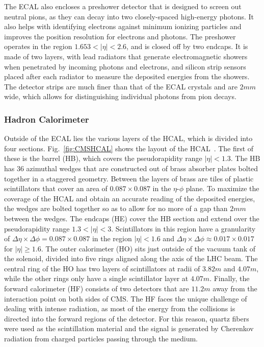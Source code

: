 The ECAL also encloses a preshower detector that is designed to screen out neutral pions, as they can decay into two closely-spaced high-energy photons.
It also helps with identifying electrons against minimum ionizing particles and improves the position resolution for electrons and photons.
The preshower operates in the region $1.653<|\eta|<2.6$, and is closed off by two endcaps.
It is made of two layers, with lead radiators that generate electromagnetic showers when penetrated by incoming photons and electrons, and silicon strip sensors placed after each radiator to measure the deposited energies from the showers.
The detector strips are much finer than that of the ECAL crystals and are $2\unit{mm}$ wide, which allows for distinguishing individual photons from pion decays.

\subsubsection{Hadron Calorimeter}

Outside of the ECAL lies the various layers of the HCAL, which is divided into four sections.
Fig.~\ref{fig:CMSHCAL} shows the layout of the HCAL~\cite{Collaboration_2010_HCAL}.
The first of these is the barrel (HB), which covers the pseudorapidity range $|\eta|<1.3$.
The HB has 36 azimuthal wedges that are constructed out of brass absorber plates bolted together in a staggered geometry.
Between the layers of brass are tiles of plastic scintillators that cover an area of $0.087\times0.087$ in the $\eta$-$\phi$ plane.
To maximize the coverage of the HCAL and obtain an accurate reading of the deposited energies, the wedges are bolted together so as to allow for no more of a gap than $2\unit{mm}$ between the wedges.
The endcaps (HE) cover the HB section and extend over the pseudorapidity range $1.3<|\eta|<3$.
Scintillators in this region have a granularity of $\Delta\eta\times\Delta\phi=0.087\times0.087$ in the region $|\eta|<1.6$ and $\Delta\eta\times\Delta\phi\approx0.017\times0.017$ for $|\eta|\geq1.6$.
The outer calorimeter (HO) sits just outside of the vacuum tank of the solenoid, divided into five rings aligned along the axis of the LHC beam.
The central ring of the HO has two layers of scintillators at radii of $3.82\unit{m}$ and $4.07\unit{m}$, while the other rings only have a single scintillator layer at $4.07\unit{m}$.
Finally, the forward calorimeter (HF) consists of two detectors that are $11.2\unit{m}$ away from the interaction point on both sides of CMS.
The HF faces the unique challenge of dealing with intense radiation, as most of the energy from the collisions is directed into the forward regions of the detector.
For this reason, quartz fibers were used as the scintillation material and the signal is generated by Cherenkov radiation from charged particles passing through the medium.

